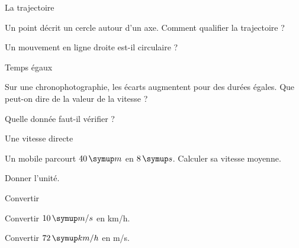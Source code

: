 \par\noindent\begin{minipage}{\linewidth}
\begin{exercice}[1]{La trajectoire}
\begin{questions}
\item Un point décrit un cercle autour d’un axe. Comment qualifier la trajectoire ?
\item Un mouvement en ligne droite est-il circulaire ?
\end{questions}
\end{exercice}
\end{minipage}
\par\noindent\begin{minipage}{\linewidth}
\begin{exercice}[1]{Temps égaux}
\begin{questions}
\item Sur une chronophotographie, les écarts augmentent pour des durées égales. Que peut-on dire de la valeur de la vitesse ?
\item Quelle donnée faut-il vérifier ?
\end{questions}
\end{exercice}
\end{minipage}
\par\noindent\begin{minipage}{\linewidth}
\begin{exercice}[1]{Une vitesse directe}
\begin{questions}
\item Un mobile parcourt $40\unite m$ en $8\unite s$. Calculer sa vitesse moyenne.
\item Donner l’unité.
\end{questions}
\end{exercice}
\end{minipage}
\par\noindent\begin{minipage}{\linewidth}
\begin{exercice}[1]{Convertir}
\begin{questions}
\item Convertir $10\unite{m/s}$ en km/h.
\item Convertir $72\unite{km/h}$ en m/s.
\end{questions}
\end{exercice}
\end{minipage}
\clearpage{}
